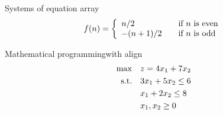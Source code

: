 \begin{frame}{Systems of equation array}
    \[
        f(n) = \left\{
        \begin{array}{l l}
            n/2      & \quad \text{if $n$ is even}\\
            -(n+1)/2 & \quad \text{if $n$ is odd}
        \end{array} \right.
    \]
\end{frame}
\note{
}


\begin{frame}{Mathematical programming}{with align}
    \begin{align}
        \max        & \quad z = 4 x_1 + 7 x_2    \notag \\
        \text{s.t.} & \quad 3 x_1 + 5 x_2 \leq 6 \label{constraint1}\\
                    & \quad   x_1 + 2 x_2 \leq 8 \label{constraint2}\\
                    & \quad   x_1, x_2 \geq 0    \notag
    \end{align}
\end{frame}
\note{
}


